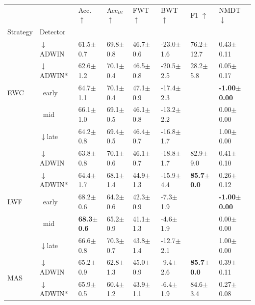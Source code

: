 \begin{tabular}{llllllll}
\toprule
 &  & Acc. $\uparrow$ & Acc$_{ttt}$ $\uparrow$ & FWT $\uparrow$ & BWT $\uparrow$ & F1 $\uparrow$ & NMDT $\downarrow$ \\
Strategy & Detector &  &  &  &  &  &  \\
\midrule
\multirow[t]{5}{*}{EWC} & $\downarrow$ADWIN & 61.5\tiny{$\pm$0.7} & 69.8\tiny{$\pm$0.8} & 46.7\tiny{$\pm$0.6} & -23.0\tiny{$\pm$1.6} & 76.2\tiny{$\pm$12.7} & 0.43\tiny{$\pm$0.11} \\
 & $\downarrow$ADWIN* & 62.6\tiny{$\pm$1.2} & 70.1\tiny{$\pm$0.4} & 46.5\tiny{$\pm$0.8} & -20.5\tiny{$\pm$2.5} & 28.2\tiny{$\pm$5.8} & 0.05\tiny{$\pm$0.17} \\
 & $\ \;$early & 64.7\tiny{$\pm$1.1} & 70.1\tiny{$\pm$0.4} & 47.1\tiny{$\pm$0.9} & -17.4\tiny{$\pm$2.3} &  & \textbf{-1.00\tiny{$\pm$0.00}} \\
 & $\ \;$mid & 66.1\tiny{$\pm$1.0} & 69.1\tiny{$\pm$0.5} & 46.1\tiny{$\pm$0.8} & -13.2\tiny{$\pm$2.2} &  & 0.00\tiny{$\pm$0.00} \\
 & $\downarrow$late & 64.2\tiny{$\pm$0.8} & 69.4\tiny{$\pm$0.5} & 46.4\tiny{$\pm$0.7} & -16.8\tiny{$\pm$1.7} &  & 1.00\tiny{$\pm$0.00} \\
\midrule
\multirow[t]{5}{*}{LWF} & $\downarrow$ADWIN & 63.8\tiny{$\pm$0.8} & 70.1\tiny{$\pm$0.6} & 46.1\tiny{$\pm$0.7} & -18.8\tiny{$\pm$1.7} & 82.9\tiny{$\pm$9.0} & 0.41\tiny{$\pm$0.10} \\
 & $\downarrow$ADWIN* & 64.4\tiny{$\pm$1.7} & 68.1\tiny{$\pm$1.4} & 44.9\tiny{$\pm$1.3} & -15.9\tiny{$\pm$4.4} & \textbf{85.7\tiny{$\pm$0.0}} & 0.26\tiny{$\pm$0.12} \\
 & $\ \;$early & 68.2\tiny{$\pm$0.6} & 64.2\tiny{$\pm$0.6} & 42.3\tiny{$\pm$0.9} & -7.3\tiny{$\pm$1.9} &  & \textbf{-1.00\tiny{$\pm$0.00}} \\
 & $\ \;$mid & \textbf{68.3\tiny{$\pm$0.6}} & 65.2\tiny{$\pm$0.9} & 41.1\tiny{$\pm$1.3} & -4.6\tiny{$\pm$1.9} &  & 0.00\tiny{$\pm$0.00} \\
 & $\downarrow$late & 66.6\tiny{$\pm$0.8} & 70.3\tiny{$\pm$0.7} & 43.8\tiny{$\pm$1.4} & -12.7\tiny{$\pm$2.1} &  & 1.00\tiny{$\pm$0.00} \\
\midrule
\multirow[t]{5}{*}{MAS} & $\downarrow$ADWIN & 65.2\tiny{$\pm$0.9} & 62.8\tiny{$\pm$1.3} & 45.0\tiny{$\pm$0.9} & -9.4\tiny{$\pm$2.6} & \textbf{85.7\tiny{$\pm$0.0}} & 0.39\tiny{$\pm$0.11} \\
 & $\downarrow$ADWIN* & 65.9\tiny{$\pm$0.5} & 60.4\tiny{$\pm$1.2} & 43.9\tiny{$\pm$1.1} & -6.4\tiny{$\pm$1.9} & 84.6\tiny{$\pm$3.4} & 0.27\tiny{$\pm$0.08} \\

\end{tabular}
